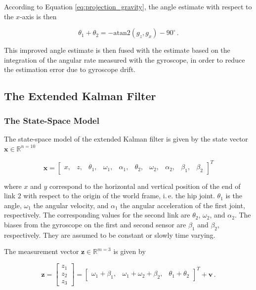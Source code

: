 \noindent
According to Equation \ref{eq:projection_gravity}, the angle estimate with respect to the $x$-axis is then

\begin{equation}
  \theta_1 + \theta_2 = -\mbox{atan}2(g_z, g_x)-90^{\circ}\,.
\end{equation}

\noindent
This improved angle estimate is then fused with the estimate based on the integration of the angular rate measured with the gyroscope, in order to reduce the estimation error due to gyroscope drift.

\subsection{The Extended Kalman Filter} \label{sec:EKF_model}

\subsubsection{The State-Space Model}

The state-space model of the extended Kalman filter is given by the state vector $\mathbf{x} \in \mathbb{R}^{n=10}$

\begin{equation} \label{eq:state_vector}
  \mathbf{x} = \begin{bmatrix}
  	x, & z, & \theta_1, & \omega_1, & \alpha_1, & \theta_2, & \omega_2, & \alpha_2, & \beta_1, & \beta_2
  \end{bmatrix}^T
\end{equation}

\noindent
where $x$ and $y$ correspond to the horizontal and vertical position of the end of link $2$ with respect to the origin of the world frame, i.\,e. the hip joint. $\theta_1$ is the angle, $\omega_1$ the angular velocity, and $\alpha_1$ the angular acceleration of the first joint, respectively. The corresponding values for the second link are $\theta_2$, $\omega_2$, and $\alpha_2$. The biases from the gyroscope on the first and second sensor are $\beta_1$ and $\beta_2$, respectively. They are assumed to be constant or slowly time varying.

The measurement vector $\mathbf{z} \in \mathbb{R}^{m=3}$ is given by

\begin{equation} \label{eq:measurement_vector}
  \mathbf{z} = \begin{bmatrix} z_1 \\ z_2 \\ z_3 \end{bmatrix} = \begin{bmatrix}
  	\omega_1 + \beta_1, & \omega_1 + \omega_2 + \beta_2, & \theta_1 + \theta_2
  \end{bmatrix}^T + \mathbf{v}\,.
\end{equation}
 
